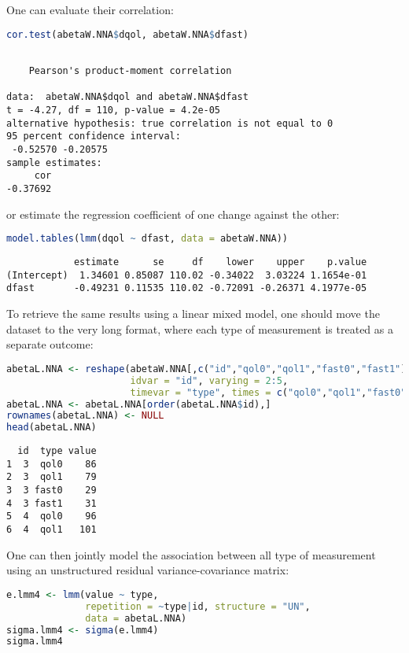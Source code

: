 \documentclass[12pt]{article}
\begin{document}
\bigskip

One can evaluate their correlation:
\begin{lstlisting}[language=r,numbers=none]
cor.test(abetaW.NNA$dqol, abetaW.NNA$dfast)
\end{lstlisting}

\label{}
\begin{verbatim}

	Pearson's product-moment correlation

data:  abetaW.NNA$dqol and abetaW.NNA$dfast
t = -4.27, df = 110, p-value = 4.2e-05
alternative hypothesis: true correlation is not equal to 0
95 percent confidence interval:
 -0.52570 -0.20575
sample estimates:
     cor 
-0.37692
\end{verbatim}

or estimate the regression coefficient of one change against the
other:
\begin{lstlisting}[language=r,numbers=none]
model.tables(lmm(dqol ~ dfast, data = abetaW.NNA))
\end{lstlisting}

\label{}
\begin{verbatim}
            estimate      se     df    lower    upper    p.value
(Intercept)  1.34601 0.85087 110.02 -0.34022  3.03224 1.1654e-01
dfast       -0.49231 0.11535 110.02 -0.72091 -0.26371 4.1977e-05
\end{verbatim}


To retrieve the same results using a linear mixed model, one should
move the dataset to the very long format, where each type of
measurement is treated as a separate outcome:
\begin{lstlisting}[language=r,numbers=none]
abetaL.NNA <- reshape(abetaW.NNA[,c("id","qol0","qol1","fast0","fast1")], direction = "long",
                      idvar = "id", varying = 2:5,
                      timevar = "type", times = c("qol0","qol1","fast0","fast1"), v.names = c("value"))
abetaL.NNA <- abetaL.NNA[order(abetaL.NNA$id),]
rownames(abetaL.NNA) <- NULL
head(abetaL.NNA)
\end{lstlisting}

\label{}
\begin{verbatim}
  id  type value
1  3  qol0    86
2  3  qol1    79
3  3 fast0    29
4  3 fast1    31
5  4  qol0    96
6  4  qol1   101
\end{verbatim}


One can then jointly model the association between all type of
measurement using an unstructured residual variance-covariance matrix:
\begin{lstlisting}[language=r,numbers=none]
e.lmm4 <- lmm(value ~ type,
              repetition = ~type|id, structure = "UN",
              data = abetaL.NNA)
sigma.lmm4 <- sigma(e.lmm4)
sigma.lmm4
\end{lstlisting}
\end{document}

